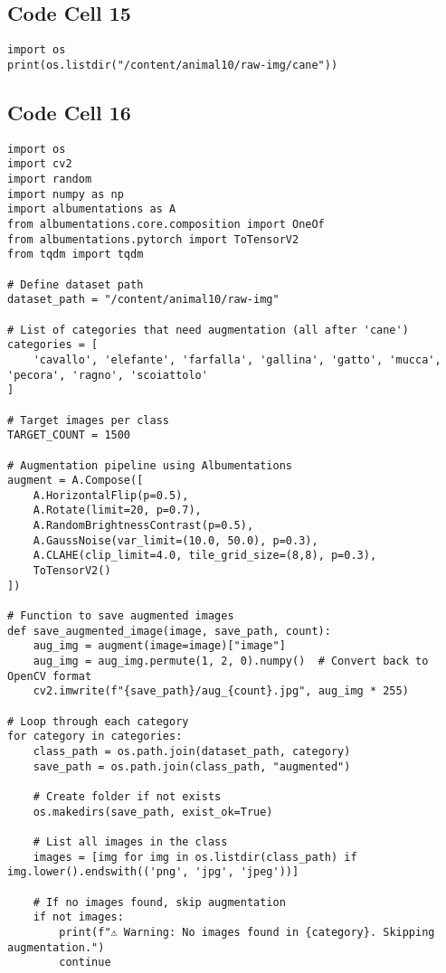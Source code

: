 \documentclass{article}
\begin{document}
\subsection*{Code Cell 15}
\begin{lstlisting}
import os
print(os.listdir("/content/animal10/raw-img/cane"))
\end{lstlisting}

\subsection*{Code Cell 16}
\begin{lstlisting}
import os
import cv2
import random
import numpy as np
import albumentations as A
from albumentations.core.composition import OneOf
from albumentations.pytorch import ToTensorV2
from tqdm import tqdm

# Define dataset path
dataset_path = "/content/animal10/raw-img"

# List of categories that need augmentation (all after 'cane')
categories = [
    'cavallo', 'elefante', 'farfalla', 'gallina', 'gatto', 'mucca', 'pecora', 'ragno', 'scoiattolo'
]

# Target images per class
TARGET_COUNT = 1500

# Augmentation pipeline using Albumentations
augment = A.Compose([
    A.HorizontalFlip(p=0.5),
    A.Rotate(limit=20, p=0.7),
    A.RandomBrightnessContrast(p=0.5),
    A.GaussNoise(var_limit=(10.0, 50.0), p=0.3),
    A.CLAHE(clip_limit=4.0, tile_grid_size=(8,8), p=0.3),
    ToTensorV2()
])

# Function to save augmented images
def save_augmented_image(image, save_path, count):
    aug_img = augment(image=image)["image"]
    aug_img = aug_img.permute(1, 2, 0).numpy()  # Convert back to OpenCV format
    cv2.imwrite(f"{save_path}/aug_{count}.jpg", aug_img * 255)

# Loop through each category
for category in categories:
    class_path = os.path.join(dataset_path, category)
    save_path = os.path.join(class_path, "augmented")

    # Create folder if not exists
    os.makedirs(save_path, exist_ok=True)

    # List all images in the class
    images = [img for img in os.listdir(class_path) if img.lower().endswith(('png', 'jpg', 'jpeg'))]

    # If no images found, skip augmentation
    if not images:
        print(f"⚠️ Warning: No images found in {category}. Skipping augmentation.")
        continue


\end{lstlisting}
\end{document}
